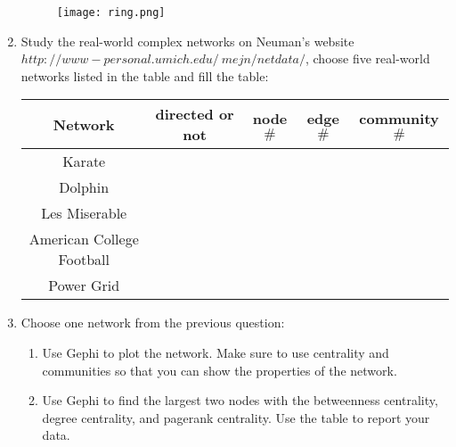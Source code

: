 \documentclass{amsart}
\theoremstyle{definition}
\theoremstyle{remark}
\numberwithin{equation}{section}
\begin{document}
\begin{enumerate}
\begin{figure}[h]
\texttt{[image: ring.png]}
\end{figure}

\clearpage
\item Study the real-world complex networks on Neuman's website $http://www-personal.umich.edu/~mejn/netdata/$, choose five real-world networks listed in the table and fill the table:

 \begin{center}
        \begin{tabular}{|c|c|c|c|c|}\hline
        Network & directed or not  &node$ \#$	 & edge$ \#$ & community$ \# $ \\ \hline
      Karate  & &  &  &   \\ \hline
        Dolphin & &  &  &   \\ \hline
       Les Miserable& &  &  &   \\ \hline
       American College Football & &  &  &   \\ \hline
         Power Grid & &  &  &   \\ \hline
        \end{tabular}
        \end{center}


\vspace{5cm}


\item Choose one network  from the previous question:
\begin{enumerate}
\item Use Gephi to plot the network. Make sure to use centrality and communities so that you can show the properties of the network.
\item Use Gephi to find the largest two nodes with the betweenness centrality, degree centrality, and pagerank centrality. Use the table to report  your data.
\end{enumerate}



\end{enumerate}
\end{document}

